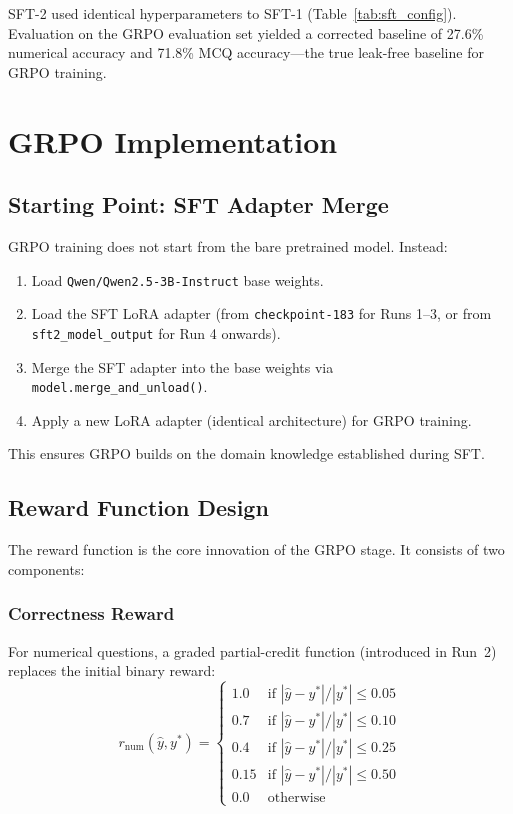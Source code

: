 \documentclass[12pt]{report}
\begin{document}
SFT-2 used identical hyperparameters to SFT-1 (Table~\ref{tab:sft_config}). Evaluation on the GRPO evaluation set yielded a corrected baseline of 27.6\% numerical accuracy and 71.8\% MCQ accuracy---the true leak-free baseline for GRPO training.

\section{GRPO Implementation}

\subsection{Starting Point: SFT Adapter Merge}

GRPO training does not start from the bare pretrained model. Instead:
\begin{enumerate}
    \item Load \texttt{Qwen/Qwen2.5-3B-Instruct} base weights.
    \item Load the SFT LoRA adapter (from \texttt{checkpoint-183} for Runs 1--3, or from \texttt{sft2\_model\_output} for Run 4 onwards).
    \item Merge the SFT adapter into the base weights via \texttt{model.merge\_and\_unload()}.
    \item Apply a new LoRA adapter (identical architecture) for GRPO training.
\end{enumerate}

This ensures GRPO builds on the domain knowledge established during SFT.

\subsection{Reward Function Design}

The reward function is the core innovation of the GRPO stage. It consists of two components:

\subsubsection{Correctness Reward}

For numerical questions, a graded partial-credit function (introduced in Run~2) replaces the initial binary reward:
\begin{equation}
r_{\text{num}}(\hat{y}, y^{*}) = 
\begin{cases}
1.0 & \text{if } |\hat{y} - y^{*}|/|y^{*}| \leq 0.05 \\
0.7 & \text{if } |\hat{y} - y^{*}|/|y^{*}| \leq 0.10 \\
0.4 & \text{if } |\hat{y} - y^{*}|/|y^{*}| \leq 0.25 \\
0.15 & \text{if } |\hat{y} - y^{*}|/|y^{*}| \leq 0.50 \\
0.0 & \text{otherwise}
\end{cases}
\label{eq:graded_reward}
\end{equation}
\end{document}
